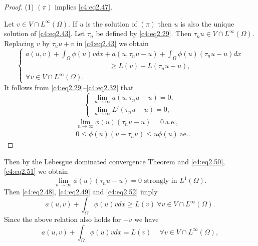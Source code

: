 \begin{proof}
(1) $(\pi)$ implies \eqref{c4:eq2.47}.

Let $v \in V \cap L^\infty (\Omega)$. If $u$ is the solution of $(\pi)$ then $u$ is also the unique solution of \eqref{c4:eq2.43}. Let $\tau_n$ be defined by \eqref{c4:eq2.29}. Then $\tau_n u \in V \cap L^\infty (\Omega)$. Replacing $v$ by $\tau_u u+v$ in \eqref{c4:eq2.43} we obtain
\begin{equation}
\begin{cases}
a (u, v) + \int_\Omega \phi (u) v dx + a (u, \tau_n u-u) + \int_\Omega
\phi (u) (\tau_n u-u) dx\\ 
\hspace{5cm}\geq L (v) + L (\tau_n u-u), \\ 
\forall v \in V \cap L^\infty (\Omega). \tag{2.48}\label{c4:eq2.48}
\end{cases}
\end{equation}\pageoriginale 
It follows from \eqref{c4:eq2.29}--\eqref{c4:eq2.32} that
\begin{equation}
\begin{cases}
\lim\limits_{n \to \infty} a (u, \tau_n u-u) = 0, \\
\lim\limits_{n \to \infty} L' (\tau_n u - u) = 0, \tag{2.49}\label{c4:eq2.49}
\end{cases}
\end{equation}
\begin{align}
& \lim_{n \to \infty} \phi (u) (\tau_n u-u) = 0 ~\text{a.e.,}
  \tag{2.50}\label{c4:eq2.50}\\ 
& 0 \leq \phi (u) (u -\tau_n u) \leq u \phi (u)
  ~\text{ae.}. \tag{2.51}\label{c4:eq2.51} 
 \end{align}  
\end{proof}  
 
Then by the Lebesgue dominated convergence Theorem and
\eqref{c4:eq2.50}, \eqref{c4:eq2.51} we obtain 
\begin{equation}
\lim_{n \to \infty} \phi (u) (\tau_n u - u) = 0 \text{ strongly in }
L^1 (\Omega). \tag{2.52}\label{c4:eq2.52} 
\end{equation}  
Then \eqref{c4:eq2.48}, \eqref{c4:eq2.49} and \eqref{c4:eq2.52} imply
$$
a (u, v) + \int_\Omega \phi (u) v dx \geq L (v) \ \forall v \in V \cap
L^\infty (\Omega). 
$$
Since the above relation also holds for $-v$ we have
\begin{equation}
a (u, v) + \int_\Omega \phi (u) v dx = L (v) \quad \, \forall v \in V 
\cap L^\infty (\Omega), \tag{2.53}\label{c4:eq2.53}
\end{equation}  
  

